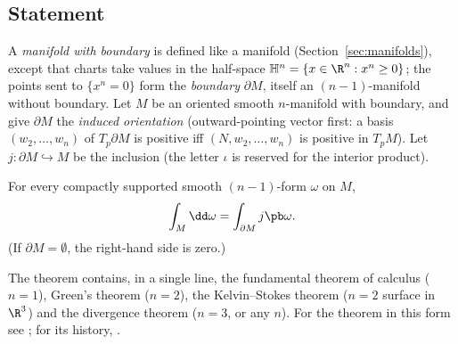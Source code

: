 \subsection{Statement}

A \emph{manifold with boundary} is defined like a manifold (Section~\ref{sec:manifolds}), except that charts take values in the half-space
$\mathbb H^n=\{x\in\R^n:x^n\ge0\}$; the points sent to $\{x^n=0\}$ form the \emph{boundary} $\partial M$, itself an $(n-1)$-manifold without boundary.
Let $M$ be an oriented smooth $n$-manifold with boundary, and give $\partial M$ the \emph{induced orientation} (outward-pointing vector first: a basis $(w_2,\dots,w_n)$ of $T_p\partial M$ is positive iff $(N,w_2,\dots,w_n)$ is positive in $T_pM$). Let $j:\partial M\hookrightarrow M$ be the inclusion (the letter $\iota$ is reserved for the interior product).

\begin{theorem}\label{thm:stokes}
For every compactly supported smooth $(n-1)$-form $\omega$ on $M$,
\begin{equation}\label{eq:stokes}
\int_M\dd\omega=\int_{\partial M}j\pb\omega .
\end{equation}
(If $\partial M=\emptyset$, the right-hand side is zero.)
\end{theorem}

The theorem contains, in a single line, the fundamental theorem of calculus ($n=1$), Green's theorem ($n=2$), the Kelvin--Stokes theorem ($n=2$ surface in $\R^3$) and the divergence theorem ($n=3$, or any $n$).
For the theorem in this form see \cite{Spivak,Lee}; for its history, \cite{Katz}.
